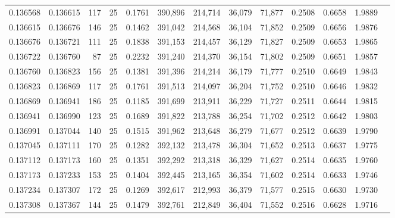\begin{tabular}{rrrrrrrrrrrrr}
0.136568 & 0.136615 &   117 &  25 &                                     0.1761 & 390,896 & 214,714 &  36,079 &  71,877 & 0.2508 & 0.6658 & 1.9889 \\
0.136615 & 0.136676 &   146 &  25 &                                     0.1462 & 391,042 & 214,568 &  36,104 &  71,852 & 0.2509 & 0.6656 & 1.9876 \\
0.136676 & 0.136721 &   111 &  25 &                                     0.1838 & 391,153 & 214,457 &  36,129 &  71,827 & 0.2509 & 0.6653 & 1.9865 \\
0.136722 & 0.136760 &    87 &  25 &                                     0.2232 & 391,240 & 214,370 &  36,154 &  71,802 & 0.2509 & 0.6651 & 1.9857 \\
0.136760 & 0.136823 &   156 &  25 &                                     0.1381 & 391,396 & 214,214 &  36,179 &  71,777 & 0.2510 & 0.6649 & 1.9843 \\
0.136823 & 0.136869 &   117 &  25 &                                     0.1761 & 391,513 & 214,097 &  36,204 &  71,752 & 0.2510 & 0.6646 & 1.9832 \\
0.136869 & 0.136941 &   186 &  25 &                                     0.1185 & 391,699 & 213,911 &  36,229 &  71,727 & 0.2511 & 0.6644 & 1.9815 \\
0.136941 & 0.136990 &   123 &  25 &                                     0.1689 & 391,822 & 213,788 &  36,254 &  71,702 & 0.2512 & 0.6642 & 1.9803 \\
0.136991 & 0.137044 &   140 &  25 &                                     0.1515 & 391,962 & 213,648 &  36,279 &  71,677 & 0.2512 & 0.6639 & 1.9790 \\
0.137045 & 0.137111 &   170 &  25 &                                     0.1282 & 392,132 & 213,478 &  36,304 &  71,652 & 0.2513 & 0.6637 & 1.9775 \\
0.137112 & 0.137173 &   160 &  25 &                                     0.1351 & 392,292 & 213,318 &  36,329 &  71,627 & 0.2514 & 0.6635 & 1.9760 \\
0.137173 & 0.137233 &   153 &  25 &                                     0.1404 & 392,445 & 213,165 &  36,354 &  71,602 & 0.2514 & 0.6633 & 1.9746 \\
0.137234 & 0.137307 &   172 &  25 &                                     0.1269 & 392,617 & 212,993 &  36,379 &  71,577 & 0.2515 & 0.6630 & 1.9730 \\
0.137308 & 0.137367 &   144 &  25 &                                     0.1479 & 392,761 & 212,849 &  36,404 &  71,552 & 0.2516 & 0.6628 & 1.9716 \\

\end{tabular}
